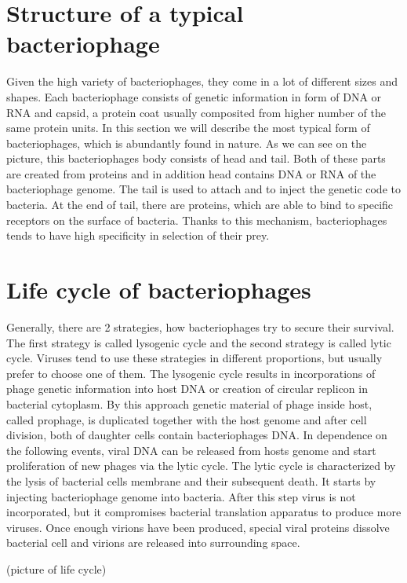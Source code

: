 \section{Structure of a typical bacteriophage}
Given the high variety of bacteriophages, they come in a lot of different sizes and shapes.
Each bacteriophage consists of genetic information in form of DNA or RNA and capsid, a protein coat usually composited from higher number of the same protein units.
In this section we will describe the most typical form of bacteriophages, which is abundantly found in nature.
As we can see on the picture, this bacteriophages body consists of head and tail.
Both of these parts are created from proteins and in addition head contains DNA or RNA of the bacteriophage genome.
The tail is used to attach and to inject the genetic code to bacteria.
At the end of tail, there are proteins, which are able to bind to specific receptors on the surface of bacteria.
Thanks to this mechanism, bacteriophages tends to have high specificity in selection of their prey.

\section{Life cycle of bacteriophages}
Generally, there are 2 strategies, how bacteriophages try to secure their survival.
The first strategy is called lysogenic cycle and the second strategy is called lytic cycle.
Viruses tend to use these strategies in different proportions, but usually prefer to choose one of them.
The lysogenic cycle results in incorporations of phage genetic information into host DNA or creation of circular replicon in bacterial cytoplasm.
By this approach genetic material of phage inside host, called prophage, is duplicated together with the host genome and after cell division, both of daughter cells contain bacteriophages DNA.
In dependence on the following events, viral DNA can be released from hosts genome and start proliferation of new phages via the lytic cycle.
The lytic cycle is characterized by the lysis of bacterial cells membrane and their subsequent death.
It starts by injecting bacteriophage genome into bacteria.
After this step virus is not incorporated, but it compromises bacterial translation apparatus to produce more viruses.
Once enough virions have been produced, special viral proteins dissolve bacterial cell and virions are released into surrounding space.

\medskip
(picture of life cycle)
\medskip

